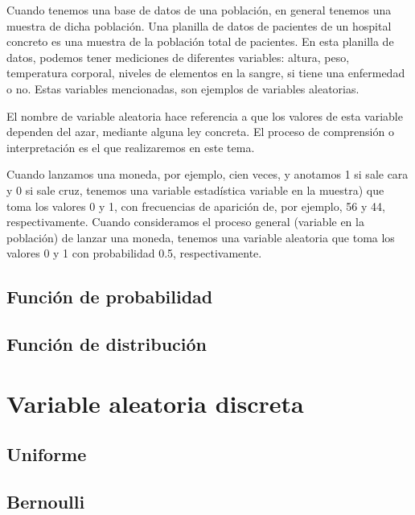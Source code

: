 \documentclass[
]{book}
\begin{document}
Cuando tenemos una base de datos de una población, en general tenemos una muestra de dicha población. Una planilla de datos de pacientes de un hospital concreto es una muestra de la población total de pacientes. En esta planilla de datos, podemos tener mediciones de diferentes variables: altura, peso, temperatura corporal, niveles de elementos en la sangre, si tiene una enfermedad o no. Estas variables mencionadas, son ejemplos de variables aleatorias.

El nombre de variable aleatoria hace referencia a que los valores de esta variable dependen del azar, mediante alguna ley concreta. El proceso de comprensión o interpretación es el que realizaremos en este tema.

Cuando lanzamos una moneda, por ejemplo, cien veces, y anotamos 1 si sale cara y 0 si sale cruz, tenemos una variable estadística variable en la muestra) que toma los valores 0 y 1, con frecuencias de aparición de, por ejemplo, 56 y 44, respectivamente. Cuando consideramos el proceso general (variable en la población) de lanzar una moneda, tenemos una variable aleatoria que toma los valores 0 y 1 con probabilidad 0.5, respectivamente.

\hypertarget{funciuxf3n-de-probabilidad-1}{%
\subsection{Función de probabilidad}\label{funciuxf3n-de-probabilidad-1}}

\hypertarget{funciuxf3n-de-distribuciuxf3n}{%
\subsection{Función de distribución}\label{funciuxf3n-de-distribuciuxf3n}}

\hypertarget{variable-aleatoria-discreta}{%
\section{Variable aleatoria discreta}\label{variable-aleatoria-discreta}}

\hypertarget{uniforme}{%
\subsection{Uniforme}\label{uniforme}}

\hypertarget{bernoulli}{%
\subsection{Bernoulli}\label{bernoulli}}
\end{document}
